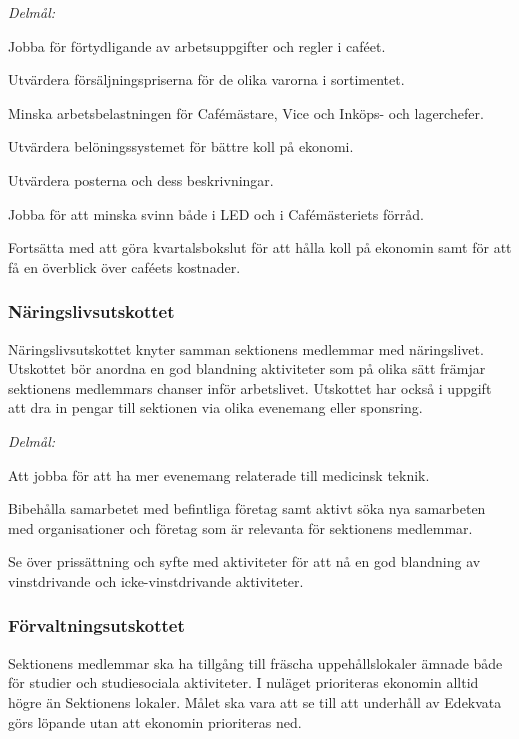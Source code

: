 \documentclass[../_main/handlingar.tex]{subfiles}
\begin{document}
\emph{Delmål:}
\begin{dashlist}
    \item Jobba för förtydligande av arbetsuppgifter och regler i caféet.
    \item Utvärdera försäljningspriserna för de olika varorna i sortimentet.
    \item Minska arbetsbelastningen för Cafémästare, Vice och Inköps- och lagerchefer.
    \item Utvärdera belöningssystemet för bättre koll på ekonomi.
    \item Utvärdera posterna och dess beskrivningar.
    \item Jobba för att minska svinn både i LED och i Cafémästeriets förråd.
    \item Fortsätta med att göra kvartalsbokslut för att hålla koll på ekonomin samt för att få en överblick över caféets kostnader.
\end{dashlist}

\subsubsection*{Näringslivsutskottet}
Näringslivsutskottet knyter samman sektionens medlemmar med näringslivet. Utskottet bör anordna en god blandning aktiviteter som på olika sätt främjar sektionens medlemmars chanser inför arbetslivet. Utskottet har också i uppgift att dra in pengar till sektionen via olika evenemang eller sponsring.

\emph{Delmål:}
\begin{dashlist}
    \item Att jobba för att ha mer evenemang relaterade till medicinsk teknik.
    \item Bibehålla samarbetet med befintliga företag samt aktivt söka nya samarbeten med organisationer och företag som är relevanta för sektionens medlemmar.
    \item Se över prissättning och syfte med aktiviteter för att nå en god blandning av vinstdrivande och icke-vinstdrivande aktiviteter.
\end{dashlist}

\subsubsection*{Förvaltningsutskottet}
Sektionens medlemmar ska ha tillgång till fräscha uppehållslokaler ämnade både för studier och studiesociala aktiviteter. I nuläget prioriteras ekonomin alltid högre än Sektionens lokaler. Målet ska vara att se till att underhåll av Edekvata görs löpande utan att ekonomin prioriteras ned.
\end{document}
